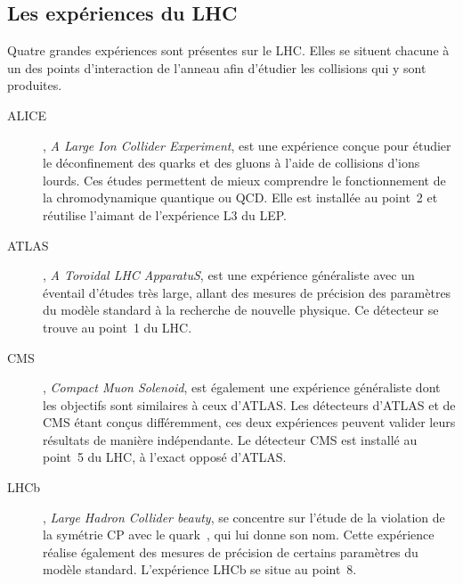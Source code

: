 \subsection{Les expériences du LHC}\label{chapter-LHC-section-LHC-subsec-experiments}
Quatre grandes expériences sont présentes sur le LHC. Elles se situent chacune à un des points d'interaction de l'anneau afin d'étudier les collisions qui y sont produites.
\begin{description}
\item[ALICE]\cite{alice_paper}, \emph{A Large Ion Collider Experiment}, est une expérience conçue pour étudier le déconfinement des quarks et des gluons à l'aide de collisions d'ions lourds. Ces études permettent de mieux comprendre le fonctionnement de la chromodynamique quantique ou QCD. Elle est installée au point~2 et réutilise l'aimant de l'expérience L3 du LEP.
\item[ATLAS]\cite{atlas_paper}, \emph{A Toroidal LHC ApparatuS}, est une expérience généraliste avec un éventail d'études très large, allant des mesures de précision des paramètres du modèle standard à la recherche de nouvelle physique. Ce détecteur se trouve au point~1 du LHC.
\item[CMS]\cite{cms_paper}, \emph{Compact Muon Solenoid}, est également une expérience généraliste dont les objectifs sont similaires à ceux d'ATLAS. Les détecteurs d'ATLAS et de CMS étant conçus différemment, ces deux expériences peuvent valider leurs résultats de manière indépendante. Le détecteur CMS est installé au point~5 du LHC, à l'exact opposé d'ATLAS.
\item[LHCb]\cite{lhcb_paper}, \emph{Large Hadron Collider beauty}, se concentre sur l'étude de la violation de la symétrie CP avec le quark~\quarkb, qui lui donne son nom. Cette expérience réalise également des mesures de précision de certains paramètres du modèle standard. L'expérience LHCb se situe au point~8.
\end{description}
